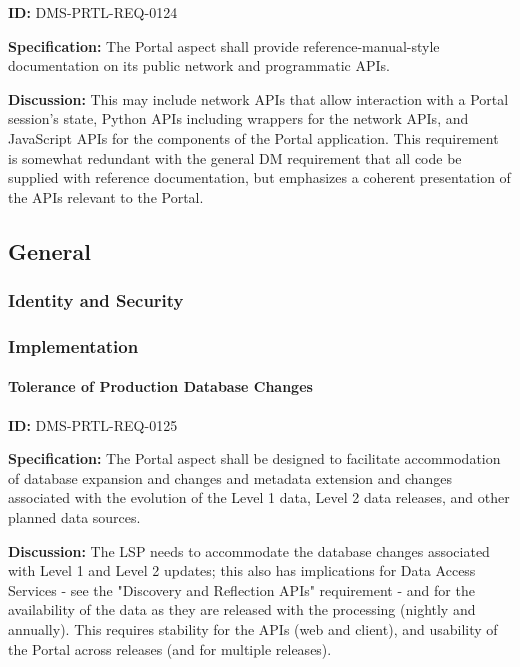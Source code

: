 \documentclass[SE,toc,lsstdraft]{lsstdoc}
\begin{document}
\label{DMS-PRTL-REQ-0124}
\textbf{ID:} DMS-PRTL-REQ-0124

\textbf{Specification:}
The Portal aspect shall provide reference-manual-style documentation on its public network and programmatic APIs.

\textbf{Discussion:}
This may include network APIs that allow interaction with a Portal session's state, Python APIs including wrappers for the network APIs, and JavaScript APIs for the components of the Portal application.
This requirement is somewhat redundant with the general DM requirement that all code be supplied with reference documentation, but emphasizes a coherent presentation of the APIs relevant to the Portal.

\subsection{General}

\subsubsection{Identity and Security}

\subsubsection{Implementation}

\paragraph{Tolerance of Production Database Changes}\hfill  %

\label{DMS-PRTL-REQ-0125}
\textbf{ID:} DMS-PRTL-REQ-0125

\textbf{Specification:}
The Portal aspect shall be designed to facilitate accommodation of database expansion and changes and metadata extension and changes associated with the evolution of the Level 1 data, Level 2 data releases, and other planned data sources.

\textbf{Discussion:}
The LSP needs to accommodate the database changes associated with Level 1 and Level 2 updates; this also has implications for Data Access Services - see the "Discovery and Reflection APIs" requirement - and for the availability of the data as they are released with the processing (nightly and annually).  This requires stability for the APIs (web and client), and usability of the Portal across releases (and for multiple releases).
\end{document}
